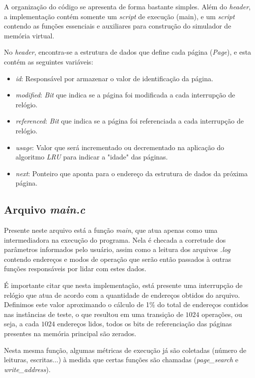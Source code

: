 \documentclass[a4paper, 12pt]{article}
\begin{document}
A organização do código se apresenta de forma bastante simples. Além do \emph{header}, a implementação contém somente um \emph{script} de execução (main), e um \emph{script} contendo as funções essenciais e auxiliares para construção do simulador de memória virtual.

No \emph{header}, encontra-se a estrutura de dados que define cada página (\emph{Page}), e esta contém as seguintes variáveis:

\begin{itemize}
    \item \emph{id}: Responsável por armazenar o valor de identificação da página.
    \item \emph{modified}: \emph{Bit} que indica se a página foi modificada a cada interrupção de relógio.
    \item \emph{referenced}: \emph{Bit} que indica se a página foi referenciada a cada interrupção de relógio.
    \item \emph{usage}: Valor que será incrementado ou decrementado na aplicação do algoritmo \emph{LRU} para indicar a "idade" das páginas.
    \item \emph{next}: Ponteiro que aponta para o endereço da estrutura de dados da próxima página.
\end{itemize}

\subsection{Arquivo \emph{main.c}}

Presente neste arquivo está a função \emph{main}, que atua apenas como uma intermediadora na execução do programa. Nela é checada a corretude dos parâmetros informados pelo usuário, assim como a leitura dos arquivos \emph{.log} contendo endereços e modos de operação que serão então passados à outras funções responsáveis por lidar com estes dados.

É importante citar que nesta implementação, está presente uma interrupção de relógio que atua de acordo com a quantidade de endereços obtidos do arquivo. Definimos este valor aproximando o cálculo de 1\% do total de endereços contidos nas instâncias de teste, o que resultou em uma transição de \(1024\) operações, ou seja, a cada \(1024\) endereços lidos, todos os bits de referenciação das páginas presentes na memória principal são zerados.

Nesta mesma função, algumas métricas de execução já são coletadas (número de leituras, escritas...) à medida que certas funções são chamadas (\emph{page\_search} e \emph{write\_address}).
\end{document}
